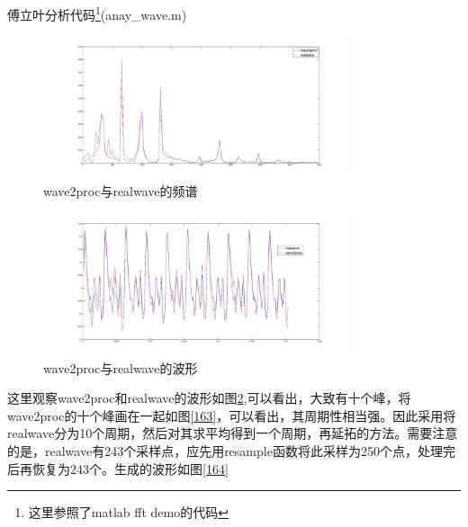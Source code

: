 \documentclass{ctexart}
\begin{document}
\begin{enumerate}
        傅立叶分析代码\footnote{这里参照了matlab fft demo的代码}(anay\_wave.m)
        
        \begin{figure}
            \centering
            \includegraphics[width=0.8\textwidth]{fmt/1_6_1.jpg}
            \caption{wave2proc与realwave的频谱\label{161}}
        \end{figure}
        \begin{figure}
            \includegraphics[width=0.8\textwidth]{fmt/1_6_2.jpg}
            \centering
            \caption{wave2proc与realwave的波形\label{162}}
        \end{figure}
        这里观察wave2proc和realwave的波形如图\ref{162},可以看出，大致有十个峰，将wave2proc的十个峰画在一起如图\ref{163}，可以看出，其周期性相当强。因此采用将realwave分为10个周期，然后对其求平均得到一个周期，再延拓的方法。需要注意的是，realwave有243个采样点，应先用resample函数将此采样为250个点，处理完后再恢复为243个。生成的波形如图\ref{164}


\end{enumerate}
\end{document}

